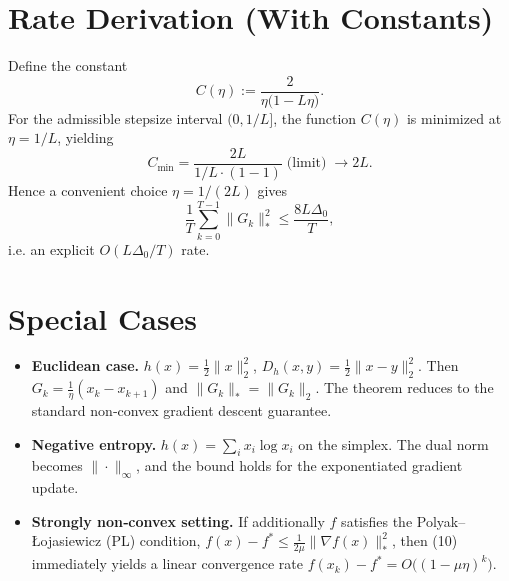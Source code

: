 \documentclass{article}
\newcommand{\Breg}[2]{D_{h}(#1,#2)}
\begin{document}
\section*{Rate Derivation (With Constants)}
Define the constant
\[
C(\eta):=\frac{2}{\eta\bigl(1-L\eta\bigr)}.
\]
For the admissible stepsize interval $(0,1/L]$, the function $C(\eta)$ is minimized at $\eta=1/L$, yielding
\[
C_{\min}= \frac{2L}{1/ L \cdot (1-1)}\;\text{(limit)}\;\to 2L.
\]
Hence a convenient choice $\eta=1/(2L)$ gives
\[
\frac{1}{T}\sum_{k=0}^{T-1}\|G_{k}\|_{*}^{2}
\le
\frac{8L\Delta_{0}}{T},
\]
i.e. an explicit $O(L\Delta_{0}/T)$ rate.

\section*{Special Cases}
\begin{itemize}
\item \textbf{Euclidean case.} $h(x)=\frac12\|x\|_{2}^{2}$, $\Breg{x}{y}=\frac12\|x-y\|_{2}^{2}$.
Then $G_{k}=\frac{1}{\eta}(x_{k}-x_{k+1})$ and $\|G_{k}\|_{*}=\|G_{k}\|_{2}$.
The theorem reduces to the standard non‑convex gradient descent guarantee.
\item \textbf{Negative entropy.} $h(x)=\sum_{i}x_{i}\log x_{i}$ on the simplex.
The dual norm becomes $\|\cdot\|_{\infty}$, and the bound holds for the
exponentiated gradient update.
\item \textbf{Strongly non‑convex setting.} If additionally $f$ satisfies the
Polyak–Łojasiewicz (PL) condition,
$f(x)-f^{*}\le\frac{1}{2\mu}\|\nabla f(x)\|_{*}^{2}$,
then (10) immediately yields a linear convergence rate
$f(x_{k})-f^{*}=O\big((1-\mu\eta)^{k}\big)$.
\end{itemize}
\end{document}
